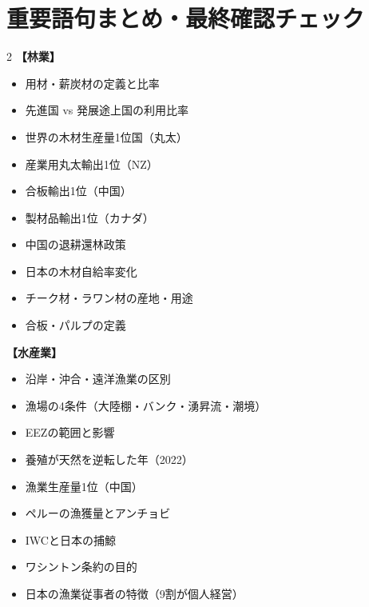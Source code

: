 \documentclass[a4paper,11pt]{article}
\begin{document}
\vspace{2mm}

\section{重要語句まとめ・最終確認チェック}

\begin{tcolorbox}[sectionbox, title={■ 最終確認チェックリスト}]
\begin{multicols}{2}
\textbf{【林業】}
\begin{itemize}[leftmargin=1em, label=\( \square \)]
  \item 用材・薪炭材の定義と比率
  \item 先進国 vs 発展途上国の利用比率
  \item 世界の木材生産量1位国（丸太）
  \item 産業用丸太輸出1位（NZ）
  \item 合板輸出1位（中国）
  \item 製材品輸出1位（カナダ）
  \item 中国の退耕還林政策
  \item 日本の木材自給率変化
  \item チーク材・ラワン材の産地・用途
  \item 合板・パルプの定義
\end{itemize}

\columnbreak

\textbf{【水産業】}
\begin{itemize}[leftmargin=1em, label=\( \square \)]
  \item 沿岸・沖合・遠洋漁業の区別
  \item 漁場の4条件（大陸棚・バンク・湧昇流・潮境）
  \item EEZの範囲と影響
  \item 養殖が天然を逆転した年（2022）
  \item 漁業生産量1位（中国）
  \item ペルーの漁獲量とアンチョビ
  \item IWCと日本の捕鯨
  \item ワシントン条約の目的
  \item 日本の漁業従事者の特徴（9割が個人経営）
\end{itemize}
\end{multicols}


\end{tcolorbox}
\end{document}
